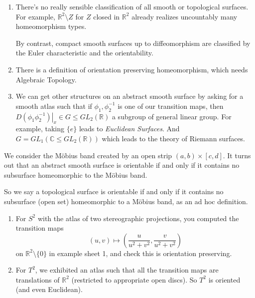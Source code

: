 \begin{remark}
    \leavevmode
    \begin{enumerate}
        \item There's no really sensible classification of all smooth or topological surfaces. For example, \(\mathbb{R}^2 \setminus Z\) for \(Z\) closed in \(\mathbb{R}^2\) already realizes uncountably many homeomorphism types.

        By contrast, compact smooth surfaces up to diffeomorphism are classified by the Euler characteristic and the orientability.
        \item There is a definition of orientation preserving homeomorphism, which needs Algebraic Topology.
        \item We can get other structures on an abstract smooth surface by asking for a smooth atlas such that if \(\phi_1,\phi_2^{-1}\) is one of our transition maps, then \(\left. D(\phi_1\phi_2^{-1})\right|_x \in G \leq GL_2(\mathbb{R})\) a subgroup of general linear group. For example, taking \(\{e\}\) leads to \textit{Euclidean Surfaces}. And \(G = GL_1(\mathbb{C} \leq GL_2(\mathbb{R}))\) which leads to the theory of Riemann surfaces.
    \end{enumerate}
\end{remark}
\begin{example}
    We consider the Möbius band created by an open strip \((a,b)\times [c,d]\). It turns out that an abstract smooth surface is orientable if and only if it contains no subsurface homeomorphic to the Möbius band.

    So we say a topological surface is orientable if and only if it contains no subsurface (open set) homeomorphic to a Möbius band, as an ad hoc definition.
\end{example}
\begin{example}
    \leavevmode
    \begin{enumerate}
    \item For \(S^2\) with the atlas of two stereographic projections, you computed the transition maps
    \[
        (u,v) \mapsto (\frac{u}{u^2 + v^2}, \frac{v}{u^2 + v^2})
    \]
    on \(\mathbb{R}^{2}\setminus \{0\}\) in example sheet 1, and check this is orientation preserving.
    \item For \(T^2\), we exhibited an atlas such that all the transition maps are translations of \(\mathbb{R}^2\) (restricted to appropriate open discs). So \(T^2\) is oriented (and even Euclidean).
    \end{enumerate}
\end{example}
